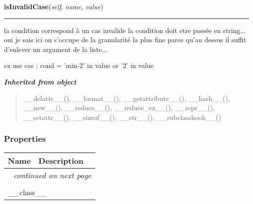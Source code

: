     \label{etude:utils:argsGenerator:ArgsGenerator:isInvalidCase}

    \vspace{0.5ex}

\hspace{.8\funcindent}\begin{boxedminipage}{\funcwidth}

    \raggedright \textbf{isInvalidCase}(\textit{self}, \textit{name}, \textit{value})

    \vspace{-1.5ex}

    \rule{\textwidth}{0.5\fboxrule}
\setlength{\parskip}{2ex}
    la condition correspond à un cas invalide la condition doit etre passée
    en string... oui je sais ici on s'occupe de la granularité la plus fine
    parce qu'au dessus il suffit d'enlever un argument de la liste...

    ex use cas : cond = 'min-2' in value or '2' in value

\setlength{\parskip}{1ex}
    \end{boxedminipage}


\large{\textbf{\textit{Inherited from object}}}

\begin{quote}
\_\_delattr\_\_(), \_\_format\_\_(), \_\_getattribute\_\_(), \_\_hash\_\_(), \_\_new\_\_(), \_\_reduce\_\_(), \_\_reduce\_ex\_\_(), \_\_repr\_\_(), \_\_setattr\_\_(), \_\_sizeof\_\_(), \_\_str\_\_(), \_\_subclasshook\_\_()
\end{quote}


  \subsubsection{Properties}

    \vspace{-1cm}
\hspace{\varindent}\begin{longtable}{|p{\varnamewidth}|p{\vardescrwidth}|l}
\cline{1-2}
\cline{1-2} \centering \textbf{Name} & \centering \textbf{Description}& \\
\cline{1-2}
\endhead\cline{1-2}\multicolumn{3}{r}{\small\textit{continued on next page}}\\\endfoot\cline{1-2}
\endlastfoot\multicolumn{2}{|l|}{\textit{Inherited from object}}\\
\multicolumn{2}{|p{\varwidth}|}{\raggedright \_\_class\_\_}\\
\cline{1-2}
\end{longtable}


